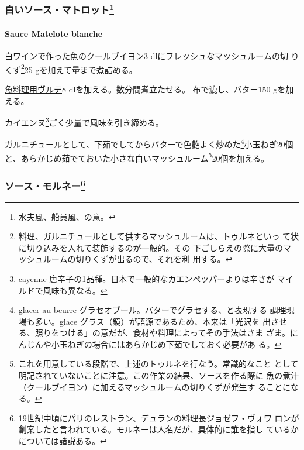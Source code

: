 \begin{recette}
{\subsubsection[白いソース・マトロット]{\texorpdfstring{白いソース・マトロット\footnote{水夫風、船員風、の意。}}{白いソース・マトロット}}\label{ux767dux3044ux30bdux30fcux30b9ux30deux30c8ux30edux30c3ux30c874}}

\hypertarget{sauce-matelote-blanche}{%
\paragraph{Sauce Matelote blanche}\label{sauce-matelote-blanche}}


白ワインで作った魚のクールブイヨン3 dlにフレッシュなマッシュルームの切
りくず\footnote{料理、ガルニチュールとして供するマッシュルームは、トゥルネといっ
  て状に切り込みを入れて装飾するのが一般的。その
  下ごしらえの際に大量のマッシュルームの切りくずが出るので、それを利
  用する。}25 gを加えて\untiers{}量まで煮詰める。

\protect\hyperlink{veloute-de-poisson}{魚料理用ヴルテ}8
dlを加える。数分間煮立たせる。 布で漉し、バター150 gを加える。

カイエンヌ\footnote{cayenne
  唐辛子の1品種。日本で一般的なカエンペッパーよりは辛さが
  マイルドで風味も異なる。}ごく少量で風味を引き締める。

ガルニチュールとして、下茹でしてからバターで色艶よく炒めた\footnote{glacer
  au beurre グラセオブール。バターでグラセする、と表現する
  調理現場も多い。glace グラス（鏡）が語源であるため、本来は「光沢を
  出させる、照りをつける」の意だが、食材や料理によってその手法はさま
  ざま。にんじんや小玉ねぎの場合にはあらかじめ下茹でしておく必要があ
  る。}小玉ねぎ20個
と、あらかじめ茹でておいた小さな白いマッシュルーム\footnote{これを用意している段階で、上述のトゥルネを行なう。常識的なこと
  として明記されていないことに注意。この作業の結果、ソースを作る際に
  魚の煮汁（クールブイヨン）に加えるマッシュルームの切りくずが発生す
  ることになる。}20個を加える。

\maeaki

\hypertarget{ux30bdux30fcux30b9ux30e2ux30ebux30cdux30fc79}{%
\subsubsection[ソース・モルネー]{\texorpdfstring{ソース・モルネー\footnote{19世紀中頃にパリのレストラン、デュランの料理長ジョゼフ・ヴォワ
  ロンが創案したと言われている。モルネーは人名だが、具体的に誰を指し
  ているかについては諸説ある。}}{ソース・モルネー}}\label{ux30bdux30fcux30b9ux30e2ux30ebux30cdux30fc79}}


\end{recette}
